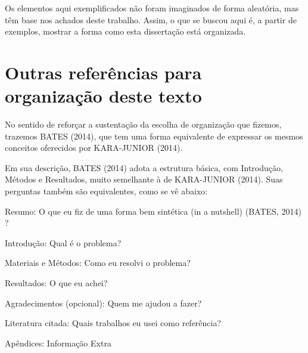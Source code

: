 \documentclass[
12pt,		%
openright,	%
twoside,  %
a4paper,			%
chapter=TITLE,		%
english,			%
french,				%
spanish,			%
brazil				%
]{USPSC-classe/USPSC}
\begin{document}
Os elementos aqui exemplificados n\~ao foram imaginados de forma aleat\'oria, mas t\^em base nos achados deste trabalho. Assim, o que se buscou aqui \'e, a partir de exemplos, mostrar a forma como esta disserta\c{c}\~ao est\'a organizada.














\section[Outras refer\^encias para organiza\c{c}\~ao deste texto]{Outras refer\^encias para organiza\c{c}\~ao deste texto}\label{Outras refer\^encias para organiza\c{c}\~ao deste texto}
No sentido de refor\c{c}ar a sustenta\c{c}\~ao da escolha de organiza\c{c}\~ao que fizemos, trazemos  BATES (2014), que tem uma forma equivalente de expressar os mesmos conceitos oferecidos por  KARA-JUNIOR (2014).














Em sua descri\c{c}\~ao, BATES (2014)  adota a estrutura b\'asica, com \textquotedbl Introdu\c{c}\~ao, M\'etodos e Resultados\textquotedbl , muito semelhante \`a de KARA-JUNIOR (2014). Suas perguntas tamb\'em s\~ao equivalentes, como se v\^e abaixo:















\begin{alineas}
\item Resumo: O que eu fiz de uma forma bem sint\'etica (\textquotedbl in a nutshell\textquotedbl ) (BATES, 2014) ?
\item Introdu\c{c}\~ao: Qual \'e o problema?
\item Materiais e M\'etodos: Como eu resolvi o problema?
\item Resultados: O que eu achei?
\item Agradecimentos (opcional): Quem me ajudou a fazer?
\item Literatura citada: Quais trabalhos eu usei como refer\^encia?
\item Ap\^endices: Informa\c{c}\~ao Extra
\end{alineas}
\end{document}
